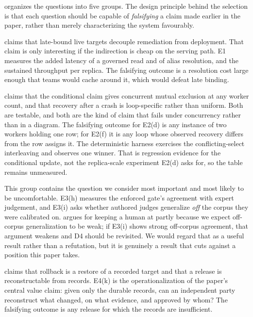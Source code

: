  organizes the questions into five groups. The design principle
behind the selection is that each question should be capable of \emph{falsifying} a
claim made earlier in the paper, rather than merely characterizing the system
favourably.

  claims that late-bound
live targets decouple remediation from deployment. That claim is only interesting if
the indirection is cheap on the serving path. E1 measures the added latency of a
governed read and of alias resolution, and the sustained throughput per replica.
The falsifying outcome is a resolution cost large enough that teams would cache
around it, which would defeat late binding.

  claims that the conditional
claim gives concurrent mutual exclusion at any worker count, and that recovery
after a crash is loop-specific rather than uniform. Both are testable, and both are
the kind of claim that fails under concurrency rather than in a diagram. The
falsifying outcome for E2(d) is any instance of two workers holding one row; for
E2(f) it is any loop whose observed recovery differs from the row
 assigns it.
The deterministic harness exercises the conflicting-select interleaving and observes
one winner. That is regression evidence for the conditional update, not the
replica-scale experiment E2(d) asks for, so the table remains unmeasured.

 This group contains the question we consider
most important and most likely to be uncomfortable. E3(h) measures the enforced
gate's agreement with expert judgement, and E3(i) asks whether authored judges
generalize \emph{off} the corpus they were calibrated on.  argues
for keeping a human at  partly because we expect off-corpus
generalization to be weak; if E3(i) shows strong off-corpus agreement, that argument
weakens and D4 should be revisited. We would regard that as a useful result rather
than a refutation, but it is genuinely a result that cuts against a position this
paper takes.

  claims that rollback is
a restore of a recorded target and that a release is reconstructable from records.
E4(k) is the operationalization of the paper's central value claim: given only the
durable records, can an independent party reconstruct what changed, on what
evidence, and approved by whom? The falsifying outcome is any release for which the
records are insufficient.


